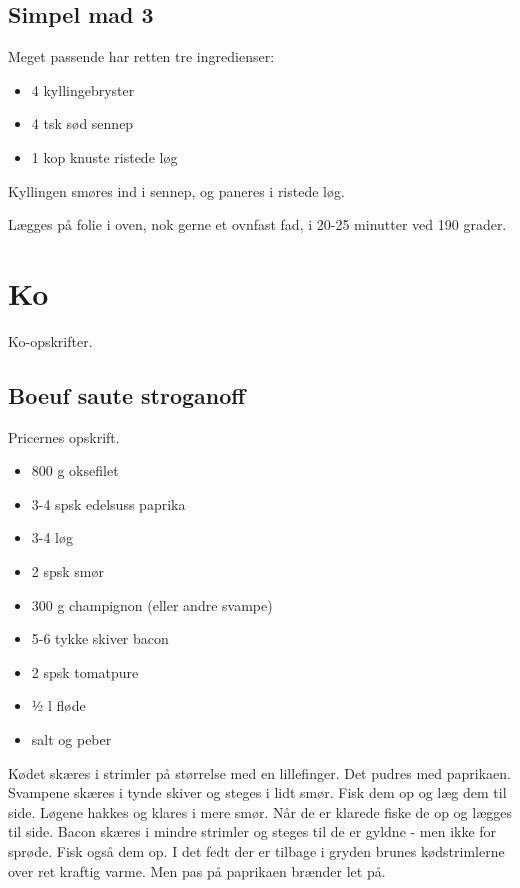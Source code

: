 \documentclass[
]{book}
\providecommand{\tightlist}{%
  \setlength{\itemsep}{0pt}\setlength{\parskip}{0pt}}
\begin{document}
\section{Simpel mad 3}\label{simpel-mad-3}

Meget passende har retten tre ingredienser:

\begin{itemize}
\tightlist
\item
  4 kyllingebryster
\item
  4 tsk sød sennep
\item
  1 kop knuste ristede løg
\end{itemize}

Kyllingen smøres ind i sennep, og paneres i ristede løg.~

Lægges på folie i oven, nok gerne et ovnfast fad, i 20-25 minutter ved 190 grader.

\chapter{Ko}\label{ko}

Ko-opskrifter.

\section{Boeuf saute stroganoff}\label{boeuf-saute-stroganoff}

Pricernes opskrift.

\begin{itemize}
\tightlist
\item
  800 g oksefilet
\item
  3-4 spsk edelsuss paprika
\item
  3-4 løg
\item
  2 spsk smør
\item
  300 g champignon (eller andre svampe)
\item
  5-6 tykke skiver bacon
\item
  2 spsk tomatpure
\item
  ½ l fløde
\item
  salt og peber
\end{itemize}

Kødet skæres i strimler på størrelse med en lillefinger. Det pudres med
paprikaen.
Svampene skæres i tynde skiver og steges i lidt smør. Fisk dem op og læg
dem til side.
Løgene hakkes og klares i mere smør. Når de er klarede fiske de op og lægges
til side.
Bacon skæres i mindre strimler og steges til de er gyldne - men ikke for
sprøde. Fisk også dem op.
I det fedt der er tilbage i gryden brunes kødstrimlerne over ret kraftig varme. Men pas på paprikaen brænder let på.
\end{document}
